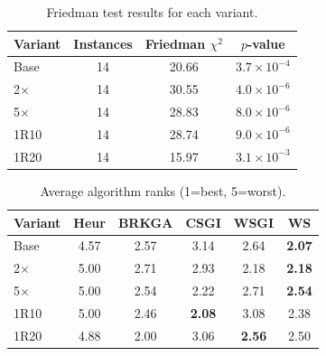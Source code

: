 \documentclass[sigconf]{acmart}
\begin{document}
\begin{table}[t]
\centering
\caption{Friedman test results for each variant.}
\label{tab:friedman_results}
\small
\begin{tabular}{lccc}
\toprule
Variant & Instances & Friedman $\chi^2$ & $p$-value \\
\midrule
Base    & 14 & 20.66 & $3.7 \times 10^{-4}$ \\
2$\times$    & 14 & 30.55 & $4.0 \times 10^{-6}$ \\
5$\times$    & 14 & 28.83 & $8.0 \times 10^{-6}$ \\
1R10    & 14 & 28.74 & $9.0 \times 10^{-6}$ \\
1R20    & 14 & 15.97 & $3.1 \times 10^{-3}$ \\
\bottomrule
\end{tabular}
\end{table}


\begin{table}[t]
\centering
\caption{Average algorithm ranks (1=best, 5=worst).}
\label{tab:avg_ranks}
\small
\begin{tabular}{lccccc}
\toprule
Variant & Heur & BRKGA & CSGI & WSGI & WS \\
\midrule
Base     & 4.57 & 2.57 & 3.14 & 2.64 & \textbf{2.07} \\
2$\times$ & 5.00 & 2.71 & 2.93 & 2.18 & \textbf{2.18} \\
5$\times$ & 5.00 & 2.54 & 2.22 & 2.71 & \textbf{2.54} \\
1R10     & 5.00 & 2.46 & \textbf{2.08} & 3.08 & 2.38 \\
1R20     & 4.88 & 2.00 & 3.06 & \textbf{2.56} & 2.50 \\
\bottomrule
\end{tabular}
\end{table}

\end{document}

